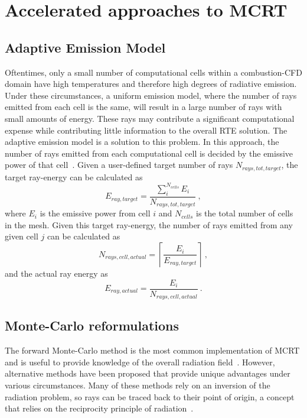 \section{Accelerated approaches to MCRT}

\subsection{Adaptive Emission Model}\label{section:adaptiveemission}
Oftentimes, only a small number of computational cells within a combustion-CFD domain have high temperatures and therefore high degrees of radiative emission. Under these circumstances, a uniform emission model, where the number of rays emitted from each cell is the same, will result in a large number of rays with small amounts of energy. These rays may contribute a significant computational expense while contributing little information to the overall RTE solution.
The adaptive emission model is a solution to this problem. In this approach, the number of rays emitted from each computational cell is decided by the emissive power of that cell~\cite{Wang2007AnFields}.
Given a user-defined target number of rays $N_{rays,tot,target}$, the target ray-energy can be calculated as 
\begin{equation}
    E_{ray,target}=\frac{\sum^{N_{cells}}_{i}E_{i}}{N_{rays,tot,target}}~,
    \label{eq:TargetRayEnergy}
\end{equation}
where $E_i$ is the emissive power from cell $i$ and $N_{cells}$ is the total number of cells in the mesh. 
Given this target ray-energy, the number of rays emitted from any given cell $j$ can be calculated as
\begin{equation}
    N_{rays,cell,actual}=\left\lceil{\frac{E_{i}}{E_{ray,target}}}\right\rceil{}~,
    \label{eq:NumberOfRays}
\end{equation}
and the actual ray energy as
\begin{equation}
    E_{ray,actual}=\frac{E_{i}}{N_{rays,cell,actual}}~.
    \label{eq:RayEnergies}
\end{equation}

\subsection{Monte-Carlo reformulations}\label{section:reformulations}
The forward Monte-Carlo method is the most common implementation of MCRT and is useful to provide knowledge of the overall radiation field~\cite{Modest2022ChapterMediac}. However, alternative methods have been proposed that provide unique advantages under various circumstances.
Many of these methods rely on an inversion of the radiation problem, so rays can be traced back to their point of origin, a concept that relies on the reciprocity principle of radiation~\cite{Case1957TransferPrinciple}.

